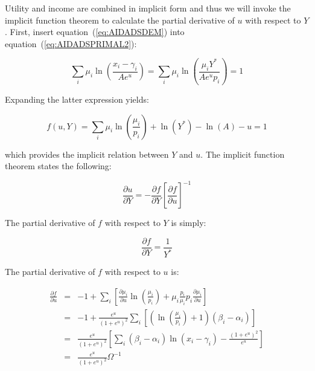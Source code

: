 Utility and income are combined in implicit form and thus we will invoke the implicit function
theorem to calculate the partial derivative of $u$ with respect to $Y$. First, insert
equation~(\ref{eq:AIDADSDEM}) into equation~(\ref{eq:AIDADSPRIMAL2}):

\[\sum\limits_i {{\mu _i}\ln \left( {\frac{{{x_i} - {\gamma _i}}}{{A{e^u}}}} \right) =
   \sum\limits_i {{\mu _i}\ln \left( {\frac{{{\mu _i}{Y^*}}}{{A{e^u}{p_i}}}} \right) = } 1}
\]

\noindent Expanding the latter expression yields:

\begin{equation}
\label{eq:AIDADSIF1}
f\left( {u,Y} \right) = \sum\limits_i {{\mu _i}\ln \left( {\frac{{{\mu _i}}}{{{p_i}}}} \right)}
   + \ln \left( {{Y^*}} \right) - \ln \left( A \right) - u = 1
\end{equation}

\noindent which provides the implicit relation between $Y$ and $u$. The implicit function theorem
states the following:

\begin{equation}
\label{eq:AIDADSIF2}
\frac{{\partial u}}{{\partial Y}} =  - \frac{{\partial f}}{{\partial Y}}
   {\left[ {\frac{{\partial f}}{{\partial u}}} \right]^{ - 1}}
\end{equation}

\noindent The partial derivative of $f$ with respect to $Y$ is simply:

\begin{equation}
\label{eq:AIDADSIF3}
\frac{{\partial f}}{{\partial Y}} = \frac{1}{{{Y^*}}}
\end{equation}

\noindent The partial derivative of $f$ with respect to $u$ is:

\begin{equation}
\label{eq:AIDADSIF4}
\begin{array}{*{20}{l}}
{\frac{\displaystyle{\partial f}}{\displaystyle{\partial u}}}& = &{ - 1 +
   \sum\limits_i {\displaystyle \left[ {\frac{{\partial {\mu _i}}}{{\partial u}}
   \ln \left( {\frac{\displaystyle{{\mu _i}}}{\displaystyle{{p_i}}}} \right) +
   {\mu _i}\frac{{{p_i}}}{{{\mu _i}}}{p_i}\frac{{\partial {\mu _i}}}{{\partial u}}} \right]} }\\
{}& = &{ - 1 + \frac{\displaystyle{{e^u}}}{\displaystyle{{{(1 + {e^u})}^2}}}\sum\limits_i
   {\left[ {\left( {\ln \left( {\frac{\displaystyle{{\mu _i}}}{\displaystyle{{p_i}}}} \right) + 1}
   \right)\left( {{\beta _i} - {\alpha _i}} \right)} \right]} }\\
{}& = &{\frac{\displaystyle{{e^u}}}{\displaystyle{{{(1 + {e^u})}^2}}}
   \left[ {\sum\limits_i {\displaystyle\left( {{\beta _i} - {\alpha _i}} \right)
   \ln \left( {{x_i} - {\gamma _i}} \right) - \frac{{{{(1 + {e^u})}^2}}}{{{e^u}}}} } \right]}\\
{}& = &{\frac{\displaystyle{\displaystyle{e^u}}}
   {\displaystyle{{{(1 + {e^u})}^2}}}{\Omega ^{ - 1}}}
\end{array}
\end{equation}

